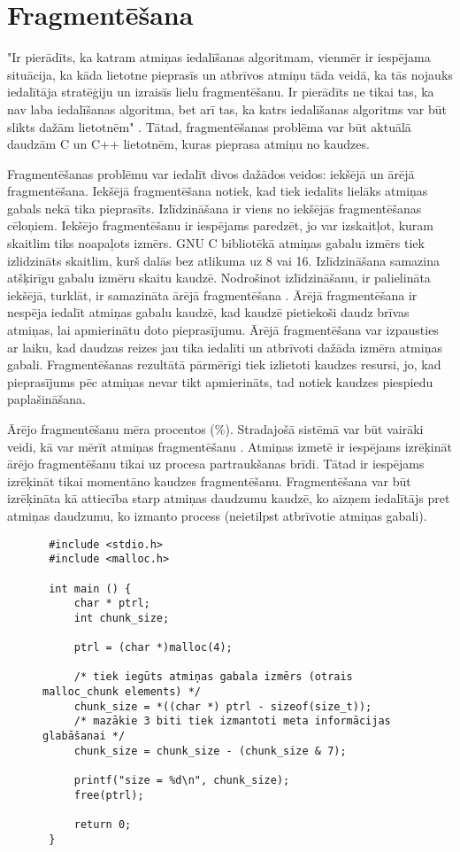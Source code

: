 \section{Fragmentēšana}

"Ir pierādīts, ka katram atmiņas iedalīšanas algoritmam, vienmēr ir iespējama situācija, ka kāda lietotne pieprasīs 
un atbrīvos atmiņu tāda veidā, ka tās nojauks iedalītāja stratēģiju un izraisīs lielu fragmentēšanu. 
Ir pierādīts ne tikai tas, ka nav laba iedalīšanas algoritma, bet arī tas, ka katrs iedalīšanas algoritms var būt slikts dažām lietotnēm" \cite{PWMS}.
Tātad, fragmentēšanas problēma var būt aktuālā daudzām C un C++ lietotnēm, kuras pieprasa atmiņu no kaudzes.

Fragmentēšanas problēmu var iedalīt divos dažādos veidos: iekšējā un ārējā fragmentēšana.
Iekšējā fragmentēšana notiek, kad tiek iedalīts lielāks atmiņas gabals nekā tika pieprasīts.
Izlīdzināšana ir viens no iekšējās fragmentēšanas cēloņiem.
Iekšējo fragmentēšanu ir iespējams paredzēt, jo var izskaitļot, kuram skaitlim tiks noapaļots izmērs.
GNU C bibliotēkā atmiņas gabalu izmērs tiek izlidzināts skaitlim, kurš dalās bez atlikuma uz 8 vai 16.
Izlīdzināšana samazina atšķirīgu gabalu izmēru skaitu kaudzē.
Nodrošinot izlīdzināšanu, ir palielināta iekšējā, turklāt, ir samazināta ārējā fragmentēšana \cite{RAN}.
Ārējā fragmentēšana ir nespēja iedalīt atmiņas gabalu kaudzē, kad kaudzē pietiekoši daudz brīvas atmiņas, lai apmierinātu doto pieprasījumu.
Ārējā fragmentēšana var izpausties ar laiku, kad daudzas reizes jau tika iedalīti un atbrīvoti dažāda izmēra atmiņas gabali.
Fragmentēšanas rezultātā pārmērīgi tiek izlietoti kaudzes resursi, jo, kad pieprasījums pēc atmiņas nevar tikt apmierināts, tad notiek kaudzes piespiedu paplašināšana.

Ārējo fragmentēšanu mēra procentos (\%). 
Stradajošā sistēmā var būt vairāki veidi, kā var mērīt atmiņas fragmentēšanu \cite{MSJ}. 
Atmiņas izmetē ir iespējams izrēķināt ārējo fragmentēšanu tikai uz procesa partraukšanas brīdi.
Tātad ir iespējams izrēķināt tikai momentāno kaudzes fragmentēšanu.
Fragmentēšana var būt izrēķināta kā attiecība starp atmiņas daudzumu kaudzē, ko aizņem iedalītājs pret atmiņas daudzumu, ko izmanto process (neietilpst atbrīvotie atmiņas gabali).


\begin{figure}[h]
\begin{lstlisting}
 #include <stdio.h>
 #include <malloc.h>

 int main () {
     char * ptrl;
     int chunk_size;

     ptrl = (char *)malloc(4);
 
     /* tiek iegūts atmiņas gabala izmērs (otrais malloc_chunk elements) */
     chunk_size = *((char *) ptrl - sizeof(size_t));
     /* mazākie 3 biti tiek izmantoti meta informācijas glabāšanai */
     chunk_size = chunk_size - (chunk_size & 7);
 
     printf("size = %d\n", chunk_size);
     free(ptrl);
 
     return 0;
 }
\end{lstlisting}
\caption{\textbf{\fontsize{11}{12}\selectfont {Izmēra noteikšana iedalītam gabalam}}}
\end{figure}


